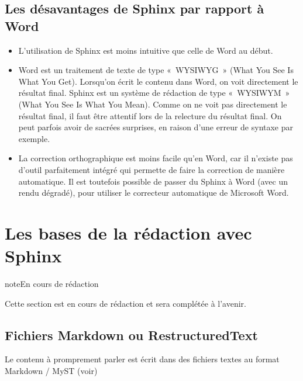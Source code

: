 \documentclass[a4,10pt,french]{sphinxmanual}
\begin{document}
\subsection{Les désavantages de Sphinx par rapport à Word}
\label{\detokenize{tutoriel-sphinx/fonctionnement:les-desavantages-de-sphinx-par-rapport-a-word}}\begin{itemize}
\item {} 
\sphinxAtStartPar
L’utilisation de Sphinx est moins intuitive que celle de Word au début.

\item {} 
\sphinxAtStartPar
Word est un traitement de texte de type « WYSIWYG » (What You See Is What You
Get). Lorsqu’on écrit le contenu dans Word, on voit directement le résultat
final. Sphinx est un système de rédaction de type « WYSIWYM » (What You See Is
What You Mean). Comme on ne voit pas directement le résultat final, il faut
être attentif lors de la relecture du résultat final. On peut parfois avoir de sacrées surprises, en raison d’une erreur de syntaxe par exemple.

\item {} 
\sphinxAtStartPar
La correction orthographique est moins facile qu’en Word, car il n’existe pas
d’outil parfaitement intégré qui permette de faire la correction de manière
automatique. Il est toutefois possible de passer du Sphinx à Word (avec un rendu dégradé), pour utiliser le correcteur automatique de Microsoft Word.

\end{itemize}


\section{Les bases de la rédaction avec Sphinx}
\label{\detokenize{tutoriel-sphinx/bases:les-bases-de-la-redaction-avec-sphinx}}\label{\detokenize{tutoriel-sphinx/bases:sphinx-bases}}\label{\detokenize{tutoriel-sphinx/bases::doc}}
\begin{sphinxadmonition}{note}{En cours de rédaction}

\sphinxAtStartPar
Cette section est en cours de rédaction et sera complétée à l’avenir.
\end{sphinxadmonition}


\subsection{Fichiers Markdown ou RestructuredText}
\label{\detokenize{tutoriel-sphinx/bases:fichiers-markdown-ou-restructuredtext}}
\sphinxAtStartPar
Le contenu à promprement parler est écrit dans des fichiers textes au format
Markdown / MyST (voir)
\end{document}
